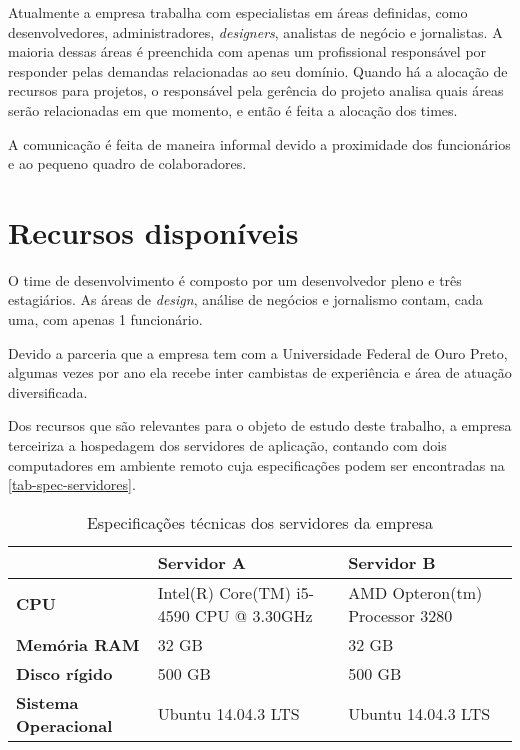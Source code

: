 \documentclass[
	12pt,				%
	openright,			%
	oneside,			%
	a4paper,			%
	english,			%
	french,				%
	spanish,			%
	brazil,				%
	]{abntex2}
\begin{document}
Atualmente a empresa trabalha com especialistas em áreas definidas, como desenvolvedores, administradores, \textit{designers}, analistas de negócio e jornalistas. A maioria dessas áreas é preenchida com apenas um profissional responsável por responder pelas demandas relacionadas ao seu domínio. Quando há a alocação de recursos para projetos, o responsável pela gerência do projeto analisa quais áreas serão relacionadas em que momento, e então é feita a alocação dos times.

A comunicação é feita de maneira informal devido a proximidade dos funcionários e ao pequeno quadro de colaboradores.

\section{Recursos disponíveis}

O time de desenvolvimento é composto por um desenvolvedor pleno e três estagiários. As áreas de \textit{design}, análise de negócios e jornalismo contam, cada uma, com apenas 1 funcionário.

Devido a parceria que a empresa tem com a Universidade Federal de Ouro Preto, algumas vezes por ano ela recebe inter cambistas de experiência e área de atuação diversificada.

Dos recursos que são relevantes para o objeto de estudo deste trabalho, a empresa terceiriza a hospedagem dos servidores de aplicação, contando com dois computadores em ambiente remoto cuja especificações podem ser encontradas na \autoref{tab-spec-servidores}.

\begin{table}[htb]
	\caption{Especificações técnicas dos servidores da empresa}

	\label{tab-spec-servidores}	
\begin{tabular}{p{3.85cm}|p{5.20cm}|p{5.20cm}}
	 & \textbf{Servidor A} & \textbf{Servidor B}  \\
	\hline
	\textbf{CPU} & Intel(R) Core(TM) i5-4590 CPU @ 3.30GHz & AMD Opteron(tm) Processor 3280 \\
	\hline
	\textbf{Memória RAM} & 32 GB & 32 GB \\
	\hline
	\textbf{Disco rígido} & 500 GB & 500 GB \\
	\hline
	\textbf{Sistema Operacional} & Ubuntu 14.04.3 LTS & Ubuntu 14.04.3 LTS \\
\end{tabular}
\end{table}
\end{document}
